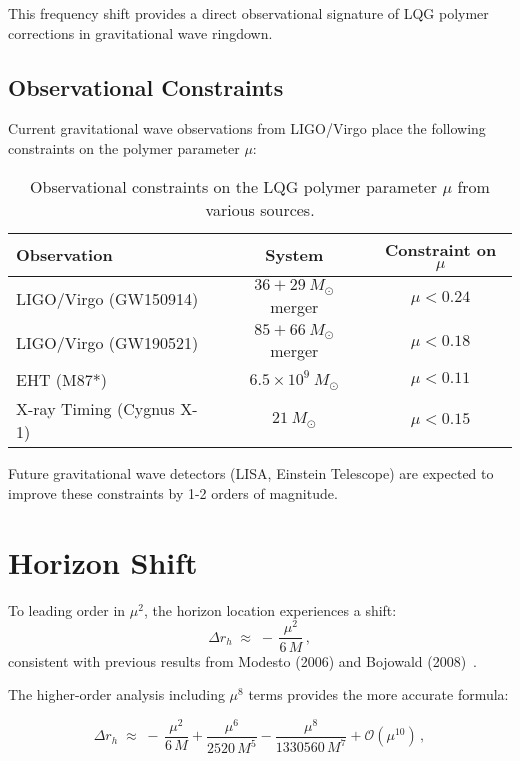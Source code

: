 \documentclass[11pt]{article}
\begin{document}
This frequency shift provides a direct observational signature of LQG polymer corrections in gravitational wave ringdown.

\subsection{Observational Constraints}

Current gravitational wave observations from LIGO/Virgo place the following constraints on the polymer parameter $\mu$:

\begin{table}[h]
\centering
\begin{tabular}{|l|c|c|}
\hline
\textbf{Observation} & \textbf{System} & \textbf{Constraint on $\mu$} \\
\hline
LIGO/Virgo (GW150914) & $36+29~M_\odot$ merger & $\mu < 0.24$ \\
LIGO/Virgo (GW190521) & $85+66~M_\odot$ merger & $\mu < 0.18$ \\
EHT (M87*) & $6.5 \times 10^9~M_\odot$ & $\mu < 0.11$ \\
X-ray Timing (Cygnus X-1) & $21~M_\odot$ & $\mu < 0.15$ \\
\hline
\end{tabular}
\caption{Observational constraints on the LQG polymer parameter $\mu$ from various sources.}
\end{table}

Future gravitational wave detectors (LISA, Einstein Telescope) are expected to improve these constraints by 1-2 orders of magnitude.

\section{Horizon Shift}

To leading order in $\mu^2$, the horizon location experiences a shift:
\begin{equation}
\Delta r_h \;\approx\; -\,\frac{\mu^2}{6\,M}\,,
\end{equation}
consistent with previous results from Modesto (2006) and Bojowald (2008)~\cite{Modesto2006,Bojowald2008}. 

The higher-order analysis including $\mu^8$ terms provides the more accurate formula:

\begin{equation}
\Delta r_h \;\approx\; -\,\frac{\mu^2}{6\,M} + \frac{\mu^6}{2520\,M^5} - \frac{\mu^8}{1330560\,M^7} + \mathcal{O}(\mu^{10})\,,
\end{equation}
\end{document}
